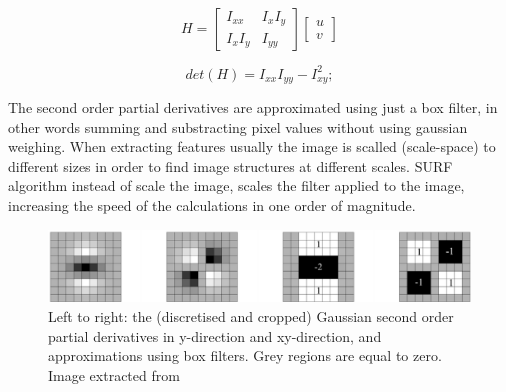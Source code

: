 $$
H = \begin{bmatrix} I_{xx} & I_x I_y \\ I_x I_y & I_{yy} \end{bmatrix} \begin{bmatrix} u \\ v \end{bmatrix}
$$

$$
det(H) = I_{xx} I_{yy} - I_{xy}^2;
$$


The second order partial derivatives are approximated using just a box filter, in other words 
summing and substracting pixel values without using gaussian weighing. When extracting features 
usually the image is scalled (scale-space) to different sizes in order to find image structures 
at different scales. SURF algorithm instead of scale the image, scales the filter applied to the 
image, increasing the speed of the calculations in one order of magnitude.


\begin{figure}
\begin{center}
\includegraphics[scale=0.35]{images/surf_mask}
\caption{Left to right: the (discretised and cropped) Gaussian second order partial derivatives 
in y-direction and xy-direction, and approximations using box filters. 
Grey regions are equal to zero. Image extracted from \cite{Bay06surf}}
\end{center}
\end{figure}

